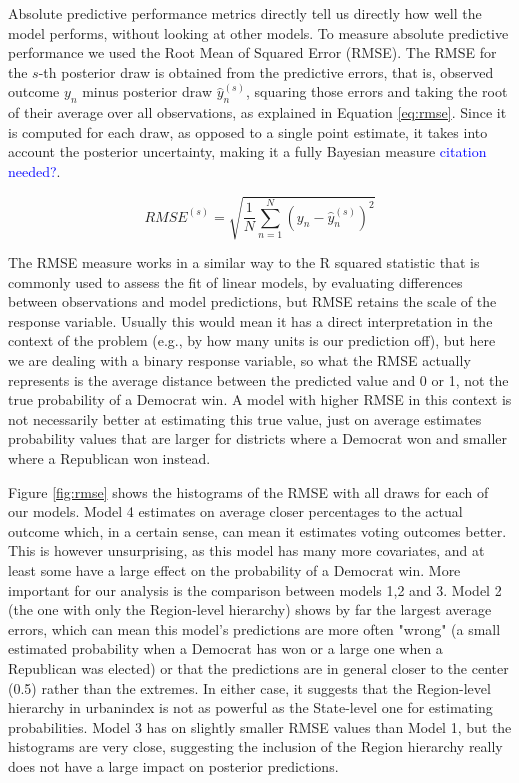 \documentclass[12pt]{article}
\newcommand{\blue}[1]{\textcolor{blue}{#1}}
\begin{document}
Absolute predictive performance metrics directly tell us directly how well the model performs, without looking at other models.
To measure absolute predictive performance we used the Root Mean of Squared Error (RMSE). The RMSE for the $s$-th posterior draw is obtained from the predictive errors, that is, observed outcome $y_n$ minus posterior draw $\hat{y}_n^{(s)}$, squaring those errors and taking the root of their average over all observations, as explained in Equation \ref{eq:rmse}.
Since it is computed for each draw, as opposed to a single point estimate, it takes into account the posterior uncertainty, making it a fully Bayesian measure \blue{citation needed?}.

\begin{equation} \label{eq:rmse}
	RMSE^{(s)} = \sqrt{
		\frac{1}{N} 
		\sum_{n = 1}^{N}
		\left( y_n - \hat{y}_n^{(s)} \right)^2
		}
\end{equation}


The RMSE measure works in a similar way to the R squared statistic that is commonly used to assess the fit of linear models, by evaluating differences between observations and model predictions, but RMSE retains the scale of the response variable.
Usually this would mean it has a direct interpretation in the context of the problem (e.g., by how many units is our prediction off), but here we are dealing with a binary response variable, so what the RMSE actually represents is the average distance between the predicted value and 0 or 1, not the true probability of a Democrat win.
A model with higher RMSE in this context is not necessarily better at estimating this true value, just on average estimates probability values that are larger for districts where a Democrat won and smaller where a Republican won instead. 

Figure \ref{fig:rmse} shows the histograms of the RMSE with all draws for each of our models.
Model 4 estimates on average closer percentages to the actual outcome which, in a certain sense, can mean it estimates voting outcomes better. This is however unsurprising, as this model has many more covariates, and at least some have a large effect on the probability of a Democrat win.
More important for our analysis is the comparison between models 1,2 and 3.
Model 2 (the one with only the Region-level hierarchy) shows by far the largest average errors, which can mean this model's predictions are more often "wrong" (a small estimated probability when a Democrat has won or a large one when a Republican was elected) or that the predictions are in general closer to the center (0.5) rather than the extremes. In either case, it suggests that the Region-level hierarchy in urbanindex is not as powerful as the State-level one for estimating probabilities.
Model 3 has on slightly smaller RMSE values than Model 1, but the histograms are very close, suggesting the inclusion of the Region hierarchy really does not have a large impact on posterior predictions.
\end{document}
